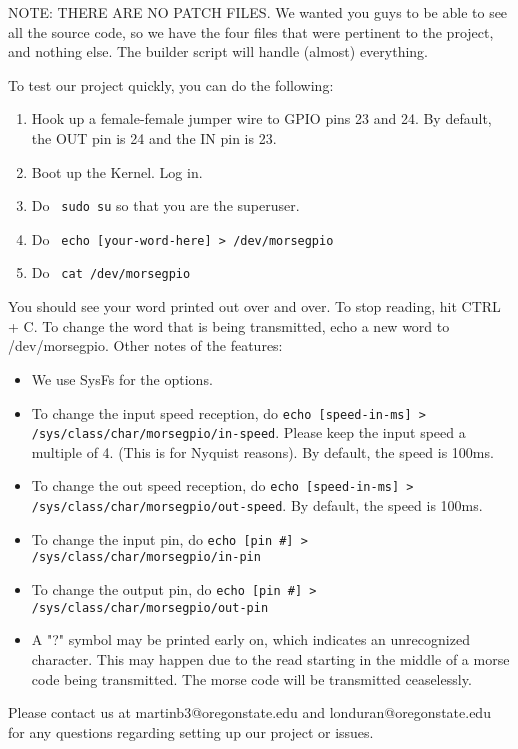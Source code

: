 \documentclass[10pt,english]{article}
\begin{document}
NOTE: THERE ARE NO PATCH FILES. We wanted you guys to be able to see all the source code, so we have the four files that were pertinent to the project, and nothing else. The builder script will handle (almost) everything.

To test our project quickly, you can do the following:

\begin{enumerate}
\item Hook up a female-female jumper wire to GPIO pins 23 and 24. By default, the OUT pin is 24 and the IN pin is 23. 
\item Boot up the Kernel. Log in.
\item Do \verb| sudo su| so that you are the superuser.
\item Do \verb| echo [your-word-here] > /dev/morsegpio|
\item Do \verb| cat /dev/morsegpio|
\end{enumerate}

You should see your word printed out over and over. To stop reading, hit CTRL + C. To change the word that is being transmitted, echo a new word to /dev/morsegpio. Other notes of the features:

\begin{itemize}
\item We use SysFs for the options.
\item To change the input speed reception, do \verb|echo [speed-in-ms] > /sys/class/char/morsegpio/in-speed|. Please keep the input speed a multiple of 4. (This is for Nyquist reasons). By default, the speed is 100ms.
\item To change the out speed reception, do \verb|echo [speed-in-ms] > /sys/class/char/morsegpio/out-speed|. By default, the speed is 100ms.
\item To change the input pin, do \verb|echo [pin #] > /sys/class/char/morsegpio/in-pin|
\item To change the output pin, do \verb|echo [pin #] > /sys/class/char/morsegpio/out-pin|
\item A "?" symbol may be printed early on, which indicates an unrecognized character. This may happen due to the read starting in the middle of a morse code being transmitted. The morse code will be transmitted ceaselessly.
\end{itemize}

Please contact us at martinb3@oregonstate.edu and londuran@oregonstate.edu for any questions regarding setting up our project or issues.
\end{document}
